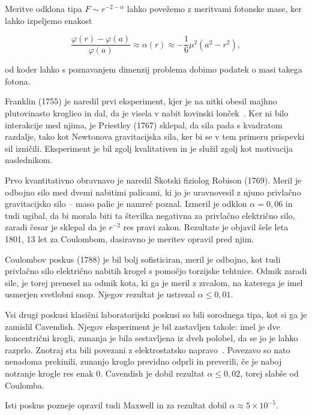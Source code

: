 \documentclass[a4paper, twocolumn, titlepage]{article}
\begin{document}
Meritve odklona tipa $F \sim r^{-2 - \alpha}$ lahko povežemo z meritvami fotonske mase, ker lahko izpeljemo enakost~\cite{over}

\begin{equation}
	\frac{\varphi(r) - \varphi(a)}{\varphi(a)} \approx \alpha(r) \approx -\frac{1}{6}\mu^2(a^2 - r^2),
\end{equation}

od koder lahko s poznavanjem dimenzij problema dobimo podatek o masi takega fotona.

Franklin (1755) je naredil prvi eksperiment, kjer je na nitki obesil majhno plutovinasto kroglico in dal, da je visela v nabit
kovinski lonček~\cite{over}. Ker ni bilo interakcije med njima, je Priestley (1767) sklepal, da sila pada s kvadratom razdalje,
tako kot Newtonova gravitacijska sila, ker bi se v tem primeru prispevki sil izničili. Eksperiment je bil zgolj kvalitativen in je
služil zgolj kot motivacija naslednikom.

Prvo kvantitativno obravnavo je naredil Škotski fiziolog Robison (1769). Meril je odbojno silo med dvemi nabitimi palicami, ki jo
je uravnovesil z njuno privlačno gravitacijsko silo -- maso palic je namreč poznal. Izmeril je odklon $\alpha = 0,06$ in tudi
ugibal, da bi morala biti ta številka negativna za privlačno električno silo, zaradi česar je sklepal da je $r^{-2}$ res pravi
zakon. Rezultate je objavil šele leta 1801, 13 let za Coulombom, dasiravno je meritev opravil pred njim.

Coulombov poskus (1788) je bil bolj sofisticiran, meril je odbojno, kot tudi privlačno silo električno nabitih krogel s pomočjo
torzijske tehtnice. Odmik zaradi sile, je torej prenesel na odmik kota, ki ga je meril z zrcalom, na katerega je imel usmerjen
svetlobni snop. Njegov rezultat je ustrezal $\alpha \leq 0,01$.

Vsi drugi poskusi klasični laboratorijski poskusi so bili sorodnega tipa, kot si ga je zamislil Cavendish. Njegov eksperiment je
bil zastavljen takole: imel je dve koncentrični krogli, zunanja je bila sestavljena iz dveh polobel, da se jo je lahko razprlo.
Znotraj sta bili povezani z elektrostatsko napravo~\cite{over}. Povezavo so nato nenadoma prekinili, zunanjo kroglo previdno odprli
in preverili, če je naboj notranje krogle res enak 0. Cavendish je dobil rezultat $\alpha \leq 0,02$, torej slabše od Coulomba.

Isti poskus pozneje opravil tudi Maxwell in za rezultat dobil $\alpha \approx 5 \times 10^{-5}$.
\end{document}
